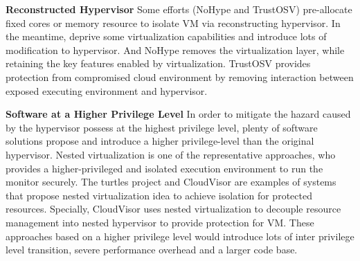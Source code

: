\documentclass[conference]{IEEEtran}
\begin{document}
\textbf{Reconstructed Hypervisor }
Some efforts (NoHype\cite{NoHype} and TrustOSV\cite{TrustOSV}) pre-allocate fixed cores or memory resource to isolate VM via reconstructing hypervisor. In the meantime, deprive some virtualization capabilities and introduce lots of modification to hypervisor. And NoHype removes the virtualization layer, while retaining the key features enabled by virtualization. TrustOSV provides protection from compromised cloud environment by removing interaction between exposed executing environment and hypervisor.

 
\textbf{Software at a Higher Privilege Level}
In order to mitigate the hazard caused by the hypervisor possess at the highest privilege level, plenty of software solutions propose and introduce a higher privilege-level than the original hypervisor. Nested virtualization is one of the representative approaches, who provides a higher-privileged and isolated 
execution environment to run the monitor securely. The turtles project \cite{Ben2007The} and CloudVisor \cite{Zhang2011CloudVisor} are examples of systems that propose nested virtualization idea to achieve isolation for protected resources. Specially, CloudVisor uses nested virtualization to decouple 
resource management into nested hypervisor to provide protection for VM. These approaches based on a higher privilege level would introduce lots of inter privilege level transition, severe performance overhead and a larger code base.
\end{document}
